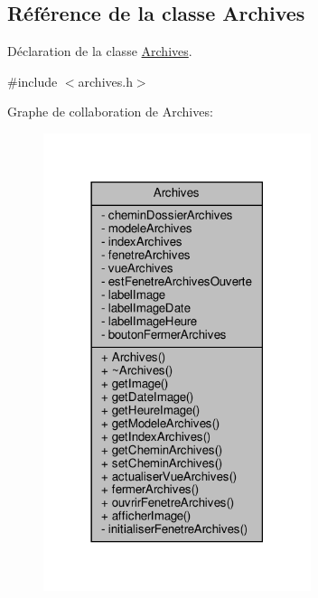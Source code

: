 \hypertarget{class_archives}{}\subsection{Référence de la classe Archives}
\label{class_archives}


Déclaration de la classe \hyperlink{class_archives}{Archives}.  




{\ttfamily \#include $<$archives.\+h$>$}



Graphe de collaboration de Archives\+:
\nopagebreak
\begin{figure}[H]
\begin{center}
\leavevmode
\includegraphics[width=222pt]{class_archives__coll__graph}
\end{center}
\end{figure}
